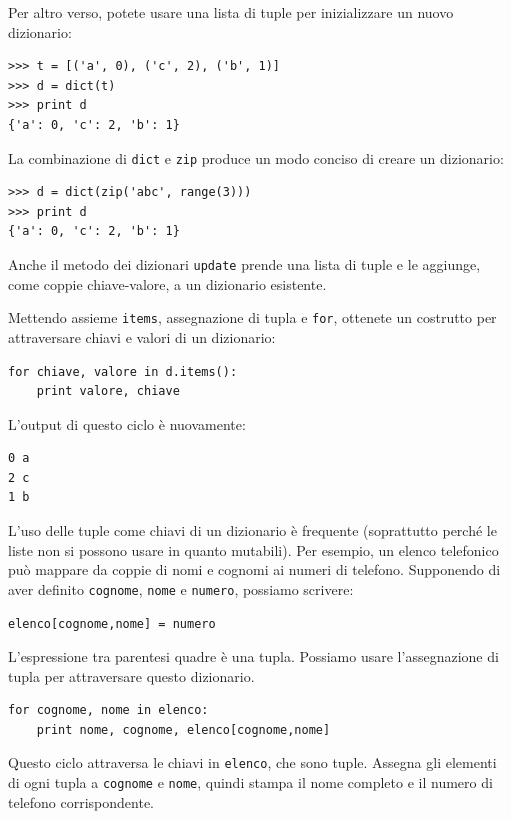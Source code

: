 \documentclass[10pt]{book}
\begin{document}
Per altro verso, potete usare una lista di tuple per inizializzare un nuovo dizionario: 

\begin{verbatim}
>>> t = [('a', 0), ('c', 2), ('b', 1)]
>>> d = dict(t)
>>> print d
{'a': 0, 'c': 2, 'b': 1}
\end{verbatim}

La combinazione di {\tt dict} e {\tt zip} produce un modo conciso di creare un dizionario:

\begin{verbatim}
>>> d = dict(zip('abc', range(3)))
>>> print d
{'a': 0, 'c': 2, 'b': 1}
\end{verbatim}
%
Anche il metodo dei dizionari {\tt update} prende una lista di tuple e le aggiunge, come coppie chiave-valore, a un dizionario esistente.

Mettendo assieme {\tt items}, assegnazione di tupla e {\tt for}, ottenete un costrutto per attraversare chiavi e valori di un dizionario:

\begin{verbatim}
for chiave, valore in d.items():
    print valore, chiave
\end{verbatim}
%
L'output di questo ciclo è nuovamente:

\begin{verbatim}
0 a
2 c
1 b
\end{verbatim}
%

L'uso delle tuple come chiavi di un dizionario è frequente (soprattutto perché le liste non si possono usare in quanto mutabili). Per esempio, un elenco telefonico può mappare da coppie di nomi e cognomi ai numeri di telefono. Supponendo di aver definito {\tt cognome}, {\tt nome} e {\tt numero}, possiamo scrivere:

\begin{verbatim}
elenco[cognome,nome] = numero
\end{verbatim}
%
L'espressione tra parentesi quadre è una tupla. Possiamo usare l'assegnazione di tupla per attraversare questo dizionario.

\begin{verbatim}
for cognome, nome in elenco:
    print nome, cognome, elenco[cognome,nome]
\end{verbatim}
%
Questo ciclo attraversa le chiavi in {\tt elenco}, che sono tuple. Assegna gli elementi di ogni tupla a {\tt cognome} e {\tt nome}, quindi stampa il nome completo e il numero di telefono corrispondente.
\end{document}
